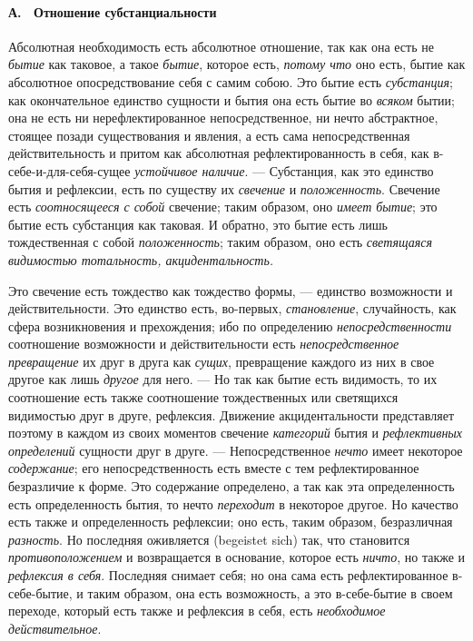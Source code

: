 \paragraph[А. \ Отношение субстанциальности]{А. \ Отношение
субстанциальности}
Абсолютная необходимость есть абсолютное
отношение, так как она есть не {\em бытие} как таковое,
а такое {\em бытие}, которое есть,
{\em потому что} оно есть, бытие как абсолютное
опосредствование себя с самим собою. Это бытие есть
{\em субстанция}; как окончательное единство сущности и
бытия она есть бытие во {\em всяком} бытии; она не есть
ни нерефлектированное непосредственное, ни нечто абстрактное, стоящее
позади существования и явления, а есть сама непосредственная
действительность и притом как абсолютная рефлектированность в себя, как
в-себе-и-для-себя-сущее {\em устойчивое наличие}. —
Субстанция, как это единство бытия и рефлексии, есть по существу их
{\em свечение} и
{\em положенность}. Свечение есть
{\em соотносящееся с собой} свечение; таким образом,
оно {\em имеет бытие}; это бытие есть субстанция как
таковая. И обратно, это бытие есть лишь тождественная с собой
{\em положенность}; таким образом, оно есть
{\em светящаяся видимостью тотальность,
акцидентальность.}

Это свечение есть тождество как тождество формы, — единство возможности и
действительности. Это единство есть, во-первых,
{\em становление}, случайность, как сфера возникновения
и прехождения; ибо по определению
{\em непосредственности} соотношение возможности и
действительности есть {\em непосредственное
превращение} их друг в друга как {\em сущих},
превращение каждого из них в свое другое как лишь
{\em другое} для него. — Но так как бытие есть
видимость, то их соотношение есть также соотношение тождественных или
светящихся видимостью друг в друге, рефлексия. Движение акцидентальности
представляет поэтому в каждом из своих моментов свечение
{\em категорий} бытия и
{\em рефлективных определений} сущности друг в друге. —
Непосредственное {\em нечто} имеет некоторое
{\em содержание}; его непосредственность есть вместе с
тем рефлектированное безразличие к форме. Это содержание определено, а так
как эта определенность есть определенность бытия, то нечто
{\em переходит} в некоторое другое. Но качество есть
также и определенность рефлексии; оно есть, таким образом, безразличная
{\em разность}. Но последняя оживляется (begeistet
sich) так, что становится {\em противоположением} и
возвращается в основание, которое есть {\em ничто}, но
также и {\em рефлексия в себя}. Последняя снимает себя;
но она сама есть рефлектированное в-себе-бытие, и таким образом, она есть
возможность, а это в-себе-бытие в своем переходе, который есть также и
рефлексия в себя, есть {\em необходимое
действительное}.

